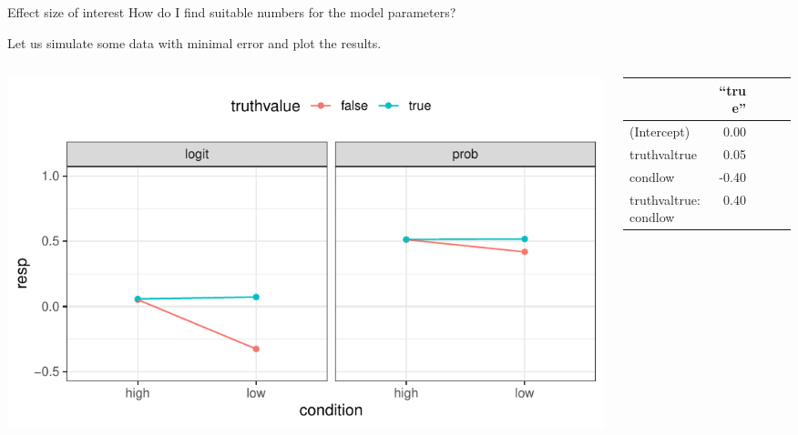 \documentclass[aspectratio=169]{beamer}
\begin{document}
\begin{frame}{Effect size of interest}
  How do I find suitable numbers for the model parameters?

  Let us simulate some data with minimal error and plot the results.
\begin{columns}
  \begin{column}[c]{.7\textwidth}
    \includegraphics[scale = .7]{../figures/find_params}
  \end{column}
  \begin{column}[c]{.3\textwidth}
    {\footnotesize
        \begin{tabular}{@{}lrrrr}
  \hline
 & ``true'' \\ 
  \hline
  (Intercept)          &  0.00 \\ 
  truthvaltrue         &  0.05 \\ 
  condlow              & -0.40  \\ 
  truthvaltrue:condlow &  0.40 \\ 
   \hline
\end{tabular}
%
    }
  \end{column}
\end{columns}

\end{frame}
\end{document}

